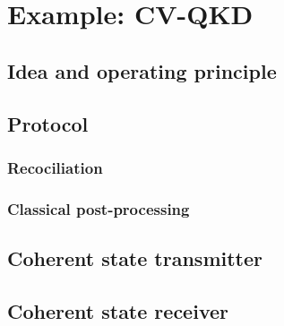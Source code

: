 \chapter{Example: CV-QKD}

\section{Idea and operating principle}

\section{Protocol}

\subsection{Recociliation}

\subsection{Classical post-processing}

\section{Coherent state transmitter}

\section{Coherent state receiver}